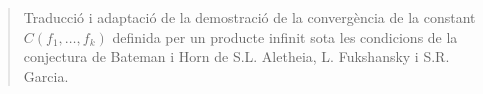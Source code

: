 \documentclass[a4paper, 11pt]{article}
\subtitle{}
\author{
Tomàs Planelles Alonso
}
\date{\today}
\begin{document}
\maketitle
\begin{abstract}
    Traducció i adaptació de la demostració de la convergència de la constant $C(f_1,\ldots,f_k)$ definida per un producte infinit sota les condicions de la conjectura de Bateman i Horn de S.L. Aletheia, L. Fukshansky i S.R. Garcia. 
\end{abstract}

\tableofcontents
\newpage









\printbibliography[
title = {References}
]
\nocite{*}
\end{document}
